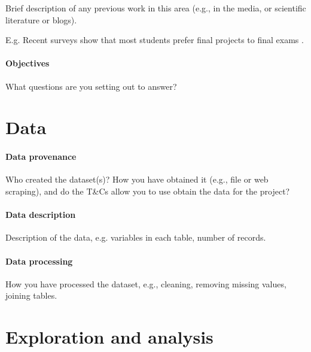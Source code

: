 \documentclass[11pt,a4paper]{article}
\begin{document}
Brief description of any previous work in this area (e.g., in the
media, or scientific literature or blogs).

E.g. Recent surveys show that most students prefer final projects to
final exams \cite{Space2021}. 

\paragraph{Objectives}

What questions are you setting out to answer?

\section{Data}

\paragraph{Data provenance} Who created the dataset(s)?  How you have
obtained it (e.g., file or web scraping), and do the T\&Cs allow you
to use obtain the data for the project?

\paragraph{Data description} Description of the data, e.g. variables
in each table, number of records.

\paragraph{Data processing} How you have processed the dataset, e.g.,
cleaning, removing missing values, joining tables.

\section{Exploration and  analysis}
\end{document}
